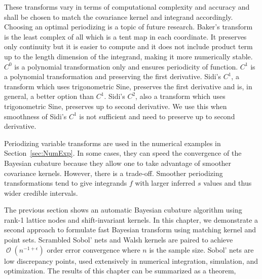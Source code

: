\documentclass{iitthesis}          %
\DeclareMathOperator{\Order}{{\mathcal O}}
\newcommand\secref{Section~\ref}
\begin{document}
These transforms vary in terms of computational complexity and accuracy and shall be chosen to match the covariance kernel and integrand accordingly. Choosing an optimal periodizing is a topic of future research. Baker's transform is the least complex of all which is a tent map in each coordinate. It preserves only continuity but it is easier to compute and it does not include product term up to the length dimension of the integrand, making it more numerically stable. $C^0$ is a polynomial transformation only and ensures periodicity of function. $C^1$ is a polynomial transformation and preserving the first derivative.
Sidi's $C^1$, a transform which uses trigonometric Sine, preserves the first derivative and is, in general, a better option than $C^1$.
Sidi's $C^2$, also a transform which uses trigonometric Sine, preserves up to second derivative. We use this when smoothness of Sidi's $C^1$ is not sufficient and need to preserve up to second derivative.

Periodizing variable transforms are used in the numerical examples in \secref{sec:NumExp}. In some cases, they can speed the convergence of the Bayesian cubature because they allow one to take advantage of smoother covariance kernels. 
However, there is a trade-off.  Smoother periodizing transformations tend to give integrands $f$ with larger inferred $s$ values and thus wider credible intervals.

































\label{sec:sobol_walsh}



The previous section shows an automatic Bayesian cubature algorithm using rank-1 lattice nodes and shift-invariant kernels. 
In this chapter, we demonstrate a second approach to formulate fast Bayesian transform using matching kernel and point sets. 
Scrambled Sobol' nets and Walsh kernels are paired to achieve $\Order(n^{-1 + \epsilon})$ order error convergence where $n$ is the sample size. 
Sobol' nets \cite{Sob67} are low discrepancy points, used extensively in numerical integration, simulation, and optimization. 
The results of this chapter can be summarized as a theorem,
\end{document}
